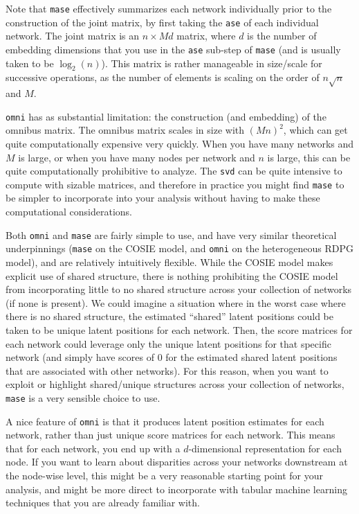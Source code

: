 Note that \texttt{mase} effectively summarizes each network individually prior to the construction of the joint matrix, by first taking the \texttt{ase} of each individual network. The joint matrix is an $n \times Md$ matrix, where $d$ is the number of embedding dimensions that you use in the \texttt{ase} sub-step of \texttt{mase} (and is usually taken to be $\log_2(n)$). This matrix is rather manageable in size/scale for successive operations, as the number of elements is scaling on the order of $n\sqrt n$ and $M$.

\texttt{omni} has as substantial limitation: the construction (and embedding) of the omnibus matrix. The omnibus matrix scales in size with $(Mn)^2$, which can get quite computationally expensive very quickly. When you have many networks and $M$ is large, or when you have many nodes per network and $n$ is large, this can be quite computationally prohibitive to analyze. The \texttt{svd} can be quite intensive to compute with sizable matrices, and therefore in practice you might find \texttt{mase} to be simpler to incorporate into your analysis without having to make these computational considerations.

Both \texttt{omni} and \texttt{mase} are fairly simple to use, and have very similar theoretical underpinnings (\texttt{mase} on the COSIE model, and \texttt{omni} on the heterogeneous RDPG model), and are relatively intuitively flexible. While the COSIE model makes explicit use of shared structure, there is nothing prohibiting the COSIE model from incorporating little to no shared structure across your collection of networks (if none is present). We could imagine a situation where in the worst case where there is no shared structure, the estimated ``shared'' latent positions could be taken to be unique latent positions for each network. Then, the score matrices for each network could leverage only the unique latent positions for that specific network (and simply have scores of $0$ for the estimated shared latent positions that are associated with other networks). For this reason, when you want to exploit or highlight shared/unique structures across your collection of networks, \texttt{mase} is a very sensible choice to use.

A nice feature of \texttt{omni} is that it produces latent position estimates for each network, rather than just unique score matrices for each network. This means that for each network, you end up with a $d$-dimensional representation for each node. If you want to learn about disparities across your networks downstream at the node-wise level, this might be a very reasonable starting point for your analysis, and might be more direct to incorporate with tabular machine learning techniques that you are already familiar with.

